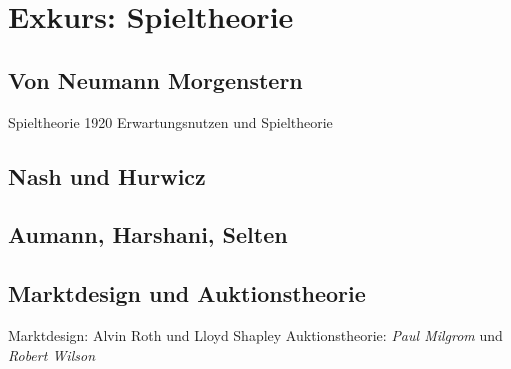 %
%
%

\chapter{Exkurs: Spieltheorie} \label{cha: Spieltheorie}
\label{Spieltheorie}

\section{Von Neumann Morgenstern}
Spieltheorie 1920
Erwartungsnutzen und Spieltheorie


\section{Nash und Hurwicz}

\section{Aumann, Harshani, Selten}

\section{Marktdesign und Auktionstheorie}

Marktdesign: Alvin Roth und Lloyd Shapley 
Auktionstheorie: \textit{Paul Milgrom} und \textit{Robert Wilson}



